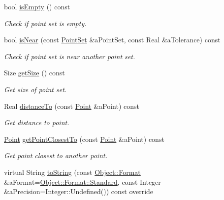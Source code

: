 \begin{DoxyCompactItemize}
bool \hyperlink{classostk_1_1math_1_1geom_1_1d2_1_1objects_1_1_point_set_a1df6b975efcbfc495dbdc947dc632846}{is\+Empty} () const
\begin{DoxyCompactList}\small\item\em Check if point set is empty. \end{DoxyCompactList}\item 
bool \hyperlink{classostk_1_1math_1_1geom_1_1d2_1_1objects_1_1_point_set_ab11988a5a567985298249b3e8d30842b}{is\+Near} (const \hyperlink{classostk_1_1math_1_1geom_1_1d2_1_1objects_1_1_point_set}{Point\+Set} \&a\+Point\+Set, const Real \&a\+Tolerance) const
\begin{DoxyCompactList}\small\item\em Check if point set is near another point set. \end{DoxyCompactList}\item 
Size \hyperlink{classostk_1_1math_1_1geom_1_1d2_1_1objects_1_1_point_set_a169dfd11b6bd2e162f1ceb632ee19508}{get\+Size} () const
\begin{DoxyCompactList}\small\item\em Get size of point set. \end{DoxyCompactList}\item 
Real \hyperlink{classostk_1_1math_1_1geom_1_1d2_1_1objects_1_1_point_set_a3d5dd5bed603fd73b8f0e8eeaeb48693}{distance\+To} (const \hyperlink{classostk_1_1math_1_1geom_1_1d2_1_1objects_1_1_point}{Point} \&a\+Point) const
\begin{DoxyCompactList}\small\item\em Get distance to point. \end{DoxyCompactList}\item 
\hyperlink{classostk_1_1math_1_1geom_1_1d2_1_1objects_1_1_point}{Point} \hyperlink{classostk_1_1math_1_1geom_1_1d2_1_1objects_1_1_point_set_a1d08aa1b16ad2865f09a25267c63e58b}{get\+Point\+Closest\+To} (const \hyperlink{classostk_1_1math_1_1geom_1_1d2_1_1objects_1_1_point}{Point} \&a\+Point) const
\begin{DoxyCompactList}\small\item\em Get point closest to another point. \end{DoxyCompactList}\item 
virtual String \hyperlink{classostk_1_1math_1_1geom_1_1d2_1_1objects_1_1_point_set_af032e86d9d9dcabe229a015a8361daf2}{to\+String} (const \hyperlink{classostk_1_1math_1_1geom_1_1d2_1_1_object_aa76f9e30caebf4005bafbdff447f66cf}{Object\+::\+Format} \&a\+Format=\hyperlink{classostk_1_1math_1_1geom_1_1d2_1_1_object_aa76f9e30caebf4005bafbdff447f66cfaeb6d8ae6f20283755b339c0dc273988b}{Object\+::\+Format\+::\+Standard}, const Integer \&a\+Precision=Integer\+::\+Undefined()) const override

\end{DoxyCompactItemize}

